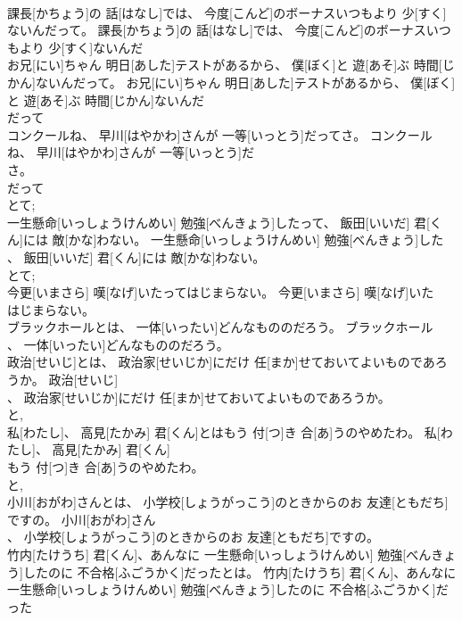 \documentclass[8pt]{extreport}
\begin{document}
\begin{CJK}{UTF8}{min}
\\	課長[かちょう]の 話[はなし]では、 今度[こんど]のボーナスいつもより 少[すく]ないんだって。	課長[かちょう]の 話[はなし]では、 今度[こんど]のボーナスいつもより 少[すく]ないんだ
\\	お兄[にい]ちゃん 明日[あした]テストがあるから、 僕[ぼく]と 遊[あそ]ぶ 時間[じかん]ないんだって。	お兄[にい]ちゃん 明日[あした]テストがあるから、 僕[ぼく]と 遊[あそ]ぶ 時間[じかん]ないんだ
\\	だって
\\	コンクールね、 早川[はやかわ]さんが 一等[いっとう]だってさ。	コンクールね、 早川[はやかわ]さんが 一等[いっとう]だ
\\	さ。	
\\	だって
\\	とて; 
\\	一生懸命[いっしょうけんめい] 勉強[べんきょう]したって、 飯田[いいだ] 君[くん]には 敵[かな]わない。	一生懸命[いっしょうけんめい] 勉強[べんきょう]した
\\	、 飯田[いいだ] 君[くん]には 敵[かな]わない。	
\\	とて; 
\\	今更[いまさら] 嘆[なげ]いたってはじまらない。	今更[いまさら] 嘆[なげ]いた
\\	はじまらない。	
\\	ブラックホールとは、 一体[いったい]どんなもののだろう。	ブラックホール
\\	、 一体[いったい]どんなもののだろう。	
\\	政治[せいじ]とは、 政治家[せいじか]にだけ 任[まか]せておいてよいものであろうか。	政治[せいじ]
\\	、 政治家[せいじか]にだけ 任[まか]せておいてよいものであろうか。	
\\	と, 
\\	私[わたし]、 高見[たかみ] 君[くん]とはもう 付[つ]き 合[あ]うのやめたわ。	私[わたし]、 高見[たかみ] 君[くん]
\\	もう 付[つ]き 合[あ]うのやめたわ。	
\\	と, 
\\	小川[おがわ]さんとは、 小学校[しょうがっこう]のときからのお 友達[ともだち]ですの。	小川[おがわ]さん
\\	、 小学校[しょうがっこう]のときからのお 友達[ともだち]ですの。	
\\	竹内[たけうち] 君[くん]、あんなに 一生懸命[いっしょうけんめい] 勉強[べんきょう]したのに 不合格[ふごうかく]だったとは。	竹内[たけうち] 君[くん]、あんなに 一生懸命[いっしょうけんめい] 勉強[べんきょう]したのに 不合格[ふごうかく]だった

\end{CJK}
\end{document}
